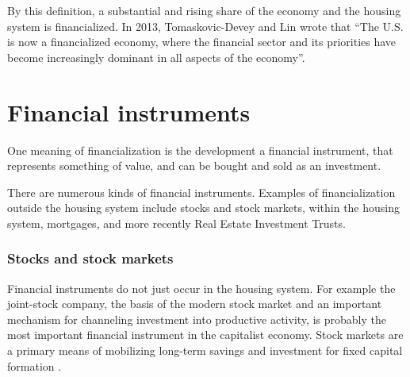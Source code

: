 By this definition, a substantial and rising share of the economy and the housing system is financialized. 
In 2013, Tomaskovic-Devey and Lin wrote that ``The U.S. is now a financialized economy, where the financial sector and its priorities have become increasingly dominant in all aspects of the economy''\cite{tomaskovic-3}. 

\section{Financial instruments} \label{section-financial-instruments}
One meaning of financialization is the development  
a \gls{financial instrument}, that represents something of value, and can be bought and sold as an investment.

There are numerous kinds of financial instruments. Examples of financialization outside the housing system include stocks and stock markets, within the housing system, mortgages, and more recently Real Estate Investment Trusts.

\subsubsection{Stocks and stock markets}
Financial instruments do not just occur in the housing system. 
For example the \gls{joint-stock company}, the basis of the modern stock market and an important mechanism for channeling investment into productive activity,  is probably the most important financial instrument in the capitalist economy.  Stock markets are %
a primary means of %
mobilizing long-term savings and investment for fixed capital formation \cite{azfarMarketMobilizedCapital2003}.  


